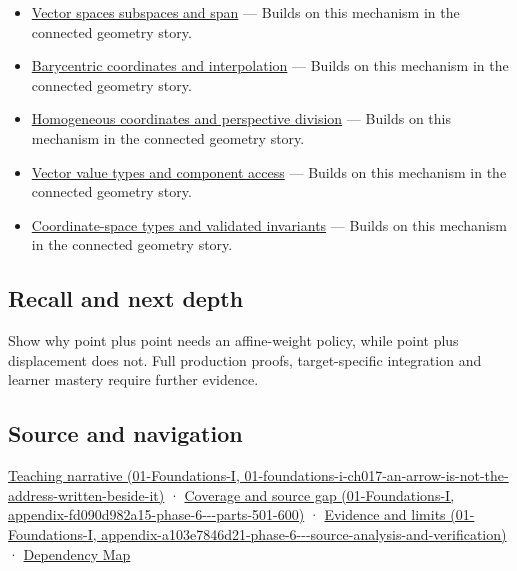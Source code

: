 \begin{itemize}
\tightlist
\item
  \hyperref[appendix-173b52c063ae]{Vector spaces subspaces and span} --- Builds on this mechanism in the connected geometry story.
\item
  \hyperref[appendix-02b9d9a81dca]{Barycentric coordinates and interpolation} --- Builds on this mechanism in the connected geometry story.
\item
  \hyperref[appendix-cb3b26862282]{Homogeneous coordinates and perspective division} --- Builds on this mechanism in the connected geometry story.
\item
  \hyperref[appendix-37a39984ba66]{Vector value types and component access} --- Builds on this mechanism in the connected geometry story.
\item
  \hyperref[appendix-380a220e2529]{Coordinate-space types and validated invariants} --- Builds on this mechanism in the connected geometry story.
\end{itemize}

\subsection{Recall and next depth}\label{appendix-0659864c0aa3-recall-and-next-depth}

Show why point plus point needs an affine-weight policy, while point plus displacement does not. Full production proofs, target-specific integration and learner mastery require further evidence.

\subsection{Source and navigation}\label{appendix-0659864c0aa3-source-and-navigation}

\href{../01-Foundations-I/main.pdf\#nameddest=01-foundations-i-ch017-an-arrow-is-not-the-address-written-beside-it}{Teaching narrative (01-Foundations-I, 01-foundations-i-ch017-an-arrow-is-not-the-address-written-beside-it)} · \href{../01-Foundations-I/main.pdf\#nameddest=appendix-fd090d982a15-phase-6---parts-501-600}{Coverage and source gap (01-Foundations-I, appendix-fd090d982a15-phase-6-\/-\/-parts-501-600)} · \href{../01-Foundations-I/main.pdf\#nameddest=appendix-a103e7846d21-phase-6---source-analysis-and-verification}{Evidence and limits (01-Foundations-I, appendix-a103e7846d21-phase-6-\/-\/-source-analysis-and-verification)} · \hyperref[appendix-4ad47bdd269a]{Dependency Map}
